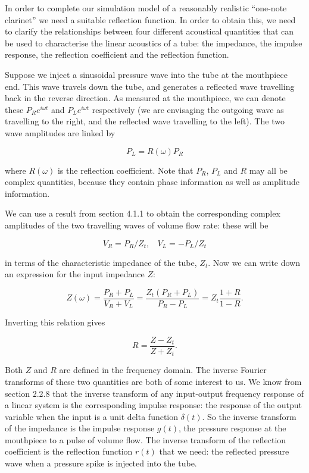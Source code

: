   In order to complete our simulation model of a reasonably realistic 
  ``one-note clarinet'' we need a suitable reflection function. In order to 
  obtain this, we need to clarify the relationships between four different 
  acoustical quantities that can be used to characterise the linear acoustics 
  of a tube: the impedance, the impulse response, the reflection coefficient 
  and the reflection function. 

  Suppose we inject a sinusoidal pressure wave into the tube at the mouthpiece 
  end. This wave travels down the tube, and generates a reflected wave 
  travelling back in the reverse direction. As measured at the mouthpiece, we 
  can denote these $P_R e^{i \omega t}$ and $P_L e^{i \omega t}$ respectively 
  (we are envisaging the outgoing wave as travelling to the right, and the 
  reflected wave travelling to the left). The two wave amplitudes are linked by 

  \begin{equation*}P_L=R(\omega) P_R \tag{1}\end{equation*} 

  \noindent{}where $R(\omega)$ is the reflection coefficient. Note that $P_R$, 
  $P_L$ and $R$ may all be complex quantities, because they contain phase 
  information as well as amplitude information. 

  We can use a result from section 4.1.1 to obtain the corresponding complex 
  amplitudes of the two travelling waves of volume flow rate: these will be 

  \begin{equation*}V_R=P_R/Z_t,\mathrm{~~~~}V_L=-P_L/Z_t \tag{2}\end{equation*} 

  \noindent{}in terms of the characteristic impedance of the tube, $Z_t$. Now 
  we can write down an expression for the input impedance $Z$: 

  \begin{equation*}Z(\omega) = 
  \dfrac{P_R+P_L}{V_R+V_L}=\dfrac{Z_t(P_R+P_L)}{P_R-P_L}=Z_t \dfrac{1+R}{1-R}. 
  \tag{3}\end{equation*} 

  Inverting this relation gives 

  \begin{equation*}R=\dfrac{Z-Z_t}{Z+Z_t}. \tag{4}\end{equation*} 

  Both $Z$ and $R$ are defined in the frequency domain. The inverse Fourier 
  transforms of these two quantities are both of some interest to us. We know 
  from section 2.2.8 that the inverse transform of any input-output frequency 
  response of a linear system is the corresponding impulse response: the 
  response of the output variable when the input is a unit delta function 
  $\delta(t)$. So the inverse transform of the impedance is the impulse 
  response $g(t)$, the pressure response at the mouthpiece to a pulse of volume 
  flow. The inverse transform of the reflection coefficient is the reflection 
  function $r(t)$ that we need: the reflected pressure wave when a pressure 
  spike is injected into the tube. 

